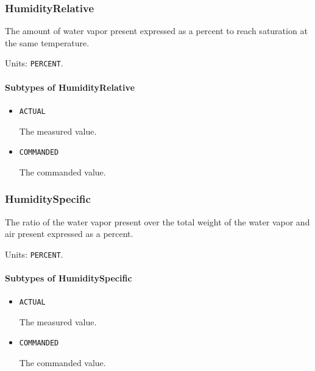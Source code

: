 \subsubsection{HumidityRelative}
\label{sec:HumidityRelative}



The amount of water vapor present expressed as a percent to reach saturation at the same temperature.


Units: \texttt{PERCENT}.

\paragraph{Subtypes of HumidityRelative}\mbox{}
\label{sec:Subtypes of HumidityRelative}

\begin{itemize}

\item \texttt{ACTUAL}


The measured value.

\item \texttt{COMMANDED}


The commanded value.


\end{itemize}

\subsubsection{HumiditySpecific}
\label{sec:HumiditySpecific}



The ratio of the water vapor present over the total weight of the water vapor and air present expressed as a percent.



Units: \texttt{PERCENT}.

\paragraph{Subtypes of HumiditySpecific}\mbox{}
\label{sec:Subtypes of HumiditySpecific}

\begin{itemize}

\item \texttt{ACTUAL}


The measured value.

\item \texttt{COMMANDED}


The commanded value.


\end{itemize}

